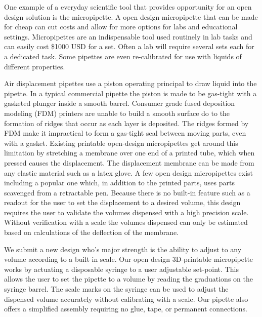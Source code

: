 \documentclass[10pt,letterpaper]{article}
\begin{document}
One example of a everyday scientific tool that provides opportunity for an open design solution is the micropipette.
A open design micropipette that can be made for cheap can cut costs and allow for more options for labs and educational settings.
Micropipettes are an indispensable tool used routinely in lab tasks and can easily cost \$1000 USD for a set.
Often a lab will require several sets each for a dedicated task.
Some pipettes are even re-calibrated for use with liquids of different properties.

Air displacement pipettes use a piston operating principal to draw liquid into the pipette\cite{ISO2002}.
In a typical commercial pipette the piston is made to be gas-tight with a gasketed plunger inside a smooth barrel.
Consumer grade fused deposition modeling (FDM) printers are unable to build a smooth surface do to the formation of ridges that occur as each layer is deposited.
The ridges formed by FDM make it impractical to form a gas-tight seal between moving parts, even with a gasket.
Existing printable open-design micropipettes get around this limitation by stretching a membrane over one end of a printed tube, which when pressed causes the displacement.
The displacement membrane can be made from any elastic material such as a latex glove.
A few open design micropipettes exist including a popular one which, in addition to the printed parts, uses parts scavenged from a retractable pen\cite{Baden2014}.
Because there is no built-in feature such as a readout for the user to set the displacement to a desired volume, this design requires the user to validate the volumes dispensed with a high precision scale.
Without verification with a scale the volumes dispensed can only be estimated based on calculations of the deflection of the membrane.

We submit a new design who's major strength is the ability to adjust to any volume according to a built in scale.
Our open design 3D-printable micropipette works by actuating a disposable syringe to a user adjustable set-point.
This allows the user to set the pipette to a volume by reading the graduations on the syringe barrel.
The scale marks on the syringe can be used to adjust the dispensed volume accurately without calibrating with a scale.
Our pipette also offers a simplified assembly requiring no glue, tape, or permanent connections.
\end{document}
